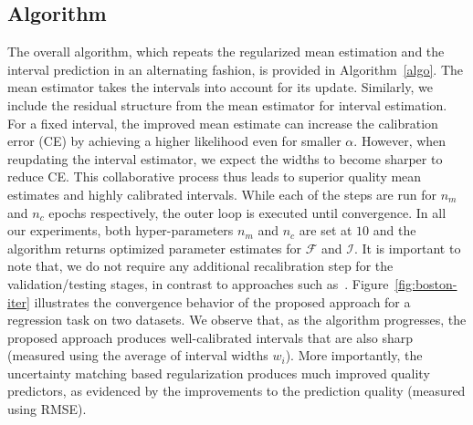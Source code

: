 \documentclass[letterpaper]{article} %
\begin{document}
\subsection{Algorithm}
The overall algorithm, which repeats the regularized mean estimation and the interval prediction in an alternating fashion, is provided in Algorithm~\ref{algo}. The mean estimator takes the intervals into account for its update. Similarly, we include the residual structure from the mean estimator for interval estimation. For a fixed interval, the improved mean estimate can increase the calibration error (CE) by achieving a higher likelihood even for smaller $\alpha$. However, when reupdating the interval estimator, we expect the widths to become sharper to reduce CE. This collaborative process thus leads to superior quality mean estimates and highly calibrated intervals. While each of the steps are run for $n_m$ and $n_c$ epochs respectively, the outer loop is executed until convergence. In all our experiments, both hyper-parameters $n_m$ and $n_c$ are set at $10$ and the algorithm returns optimized parameter estimates for $\mathcal{F}$ and $\mathcal{I}$. It is important to note that, we do not require any additional recalibration step for the validation/testing stages, in contrast to approaches such as~\cite{kuleshov2018accurate,platt1999probabilistic}. Figure~\ref{fig:boston-iter} illustrates the convergence behavior of the proposed approach for a regression task on two datasets. We observe that, as the algorithm progresses, the proposed approach produces well-calibrated intervals that are also sharp (measured using the average of interval widths $w_i$). More importantly, the uncertainty matching based regularization produces much improved quality predictors, as evidenced by the improvements to the prediction quality (measured using RMSE).
\end{document}

